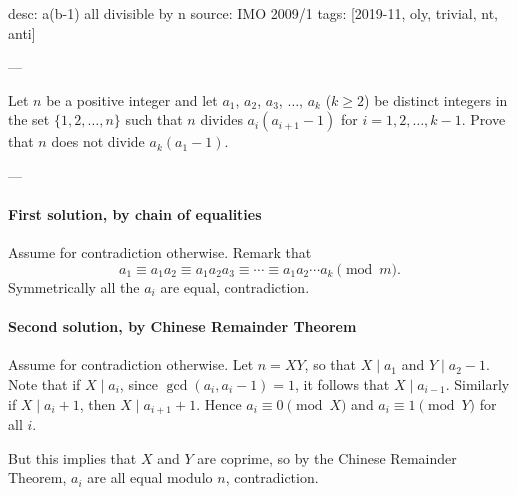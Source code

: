desc: a(b-1) all divisible by n
source: IMO 2009/1
tags: [2019-11, oly, trivial, nt, anti]

---

Let $n$ be a positive integer and let $a_1$, $a_2$, $a_3$, $\ldots$, $a_k$ ($k\ge 2$) be distinct integers in the set $\{1,2,\ldots,n\}$ such that $n$ divides $a_i(a_{i+1}-1)$ for $i=1,2,\ldots,k-1$. Prove that $n$ does not divide $a_k(a_1-1)$.

---

\paragraph{First solution, by chain of equalities}     Assume for contradiction otherwise. Remark that \[a_1\equiv a_1a_2\equiv a_1a_2a_3\equiv\cdots\equiv a_1a_2\cdots a_k\pmod m.\]
Symmetrically all the $a_i$ are equal, contradiction.

\paragraph{Second solution, by Chinese Remainder Theorem}     Assume for contradiction otherwise. Let $n=XY$, so that $X\mid a_1$ and $Y\mid a_2-1$. Note that if $X\mid a_i$, since $\gcd(a_i,a_i-1)=1$, it follows that $X\mid a_{i-1}$. Similarly if $X\mid a_i+1$, then $X\mid a_{i+1}+1$. Hence $a_i\equiv 0\pmod X$ and $a_i\equiv 1\pmod Y$ for all $i$.

But this implies that $X$ and $Y$ are coprime, so by the Chinese Remainder Theorem, $a_i$ are all equal modulo $n$, contradiction.

